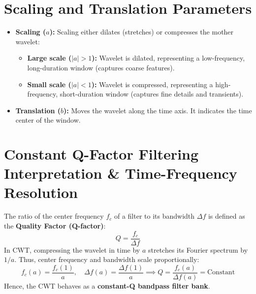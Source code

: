 \documentclass[12pt,a4paper]{article}
\begin{document}
\section{Scaling and Translation Parameters}

\begin{itemize}[leftmargin=*, itemsep=4pt]
  \item \textbf{Scaling ($a$):} Scaling either dilates (stretches) or compresses the mother wavelet:
  \begin{itemize}[leftmargin=*, itemsep=2pt, topsep=2pt]
    \item \textbf{Large scale ($|a| > 1$):} Wavelet is dilated, representing a low-frequency, long-duration window (captures coarse features).
    \item \textbf{Small scale ($|a| < 1$):} Wavelet is compressed, representing a high-frequency, short-duration window (captures fine details and transients).
  \end{itemize}
  \item \textbf{Translation ($b$):} Moves the wavelet along the time axis. It indicates the time center of the window.
\end{itemize}

\section{Constant Q-Factor Filtering Interpretation \& Time-Frequency Resolution}

The ratio of the center frequency $f_c$ of a filter to its bandwidth $\Delta f$ is defined as the \textbf{Quality Factor (Q-factor)}:
$$Q = \frac{f_c}{\Delta f}$$
In CWT, compressing the wavelet in time by $a$ stretches its Fourier spectrum by $1/a$. Thus, center frequency and bandwidth scale proportionally:
$$f_c(a) = \frac{f_c(1)}{a}, \quad \Delta f(a) = \frac{\Delta f(1)}{a} \implies Q = \frac{f_c(a)}{\Delta f(a)} = \text{Constant}$$
Hence, the CWT behaves as a \textbf{constant-Q bandpass filter bank}.
\end{document}
